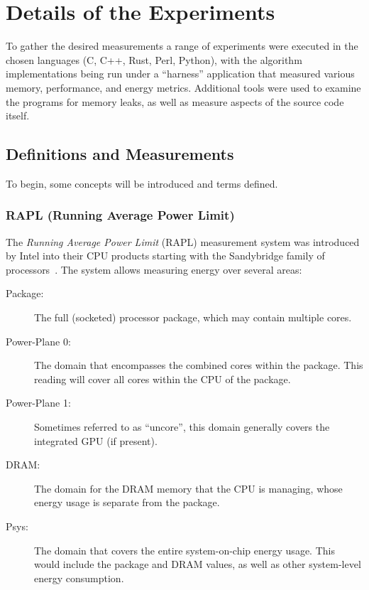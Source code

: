 \section{Details of the Experiments}
\label{sec:experiments}

To gather the desired measurements a range of experiments were executed in the chosen languages (C, C++, Rust, Perl, Python), with the algorithm implementations being run under a ``harness'' application that measured various memory, performance, and energy metrics. Additional tools were used to examine the programs for memory leaks, as well as measure aspects of the source code itself.

\subsection{Definitions and Measurements}

To begin, some concepts will be introduced and terms defined.

\subsubsection{RAPL (Running Average Power Limit)}
\label{subsubsec:rapl}

The \textit{Running Average Power Limit} (RAPL) measurement system was introduced by Intel into their CPU products starting with the Sandybridge family of processors~\cite{khan}. The system allows measuring energy over several areas:

\begin{description}
\item[Package:] The full (socketed) processor package, which may contain multiple cores.
\item[Power-Plane 0:] The domain that encompasses the combined cores within the package. This reading will cover all cores within the CPU of the package.
\item[Power-Plane 1:] Sometimes referred to as ``uncore'', this domain generally covers the integrated GPU (if present).
\item[DRAM:] The domain for the DRAM memory that the CPU is managing, whose energy usage is separate from the package.
\item[Psys:] The domain that covers the entire system-on-chip energy usage. This would include the package and DRAM values, as well as other system-level energy consumption.
\end{description}

